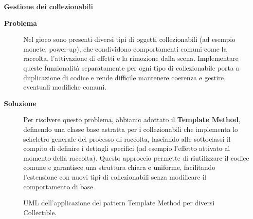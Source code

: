\documentclass[a4paper,12pt]{report}
\begin{document}
\noindent
\textbf{Gestione dei collezionabili}
\begin{description}
	\item[\textbf{Problema}]
	      Nel gioco sono presenti diversi tipi di oggetti collezionabili (ad esempio monete, power-up), che condividono comportamenti comuni come la raccolta, l'attivazione di effetti e la rimozione dalla
	      scena. Implementare queste funzionalità separatamente per ogni tipo di collezionabile porta a duplicazione di codice e rende difficile mantenere coerenza e gestire eventuali modifiche comuni.

	\item[\textbf{Soluzione}]
	      Per risolvere questo problema, abbiamo adottato il \textbf{Template Method}, definendo una classe base astratta per i collezionabili che implementa lo scheletro generale del processo di raccolta,
	      lasciando alle sottoclassi il compito di definire i dettagli specifici (ad esempio l'effetto attivato al momento della raccolta). Questo approccio permette di riutilizzare il codice comune e
	      garantisce una struttura chiara e uniforme, facilitando l'estensione con nuovi tipi di collezionabili senza modificare il comportamento di base.
\end{description}
\begin{figure}[H]
	\centering{}
	
	\caption{UML dell'applicazione del pattern Template Method per diversi Collectible.}
	\label{img:collectible}
\end{figure}
\end{document}

